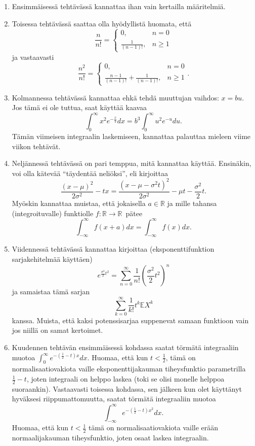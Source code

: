 \documentclass[11pt,a4paper]{amsart}
\newcommand{\R}{\mathbb{R}}
\newcommand{\E}{\mathbb{E}}
\newcommand{\1}{\mathbf{1}}
\begin{document}
\begin{Solution}
\begin{enumerate}
\item Ensimmäisessä tehtävässä kannattaa ihan vain kertailla määritelmiä. 
\item Toisessa tehtävässä saattaa olla hyödyllistä huomata, että 
\[
\frac{n}{n!}=\begin{cases}
0, & n=0\\
\frac{1}{(n-1)!}, & n\geq 1
\end{cases}
\]
ja vastaavasti 
\[
\frac{n^2}{n!}=\begin{cases}
0, & n=0\\
\frac{n-1}{(n-1)!}+\frac{1}{(n-1)!}, & n\geq 1
\end{cases}.
\]
\item Kolmannessa tehtävässä kannattaa ehkä tehdä muuttujan vaihdos: $x=bu$. Jos tämä ei ole tuttua, saat käyttää kaavaa 
\[
\int_{0}^\infty x^2 e^{-\frac{x}{b}}dx=b^3 \int_0^\infty u^2 e^{-u}du.
\]
Tämän viimeisen integraalin laskemiseen, kannattaa palauttaa mieleen viime viikon tehtävät.
\item Neljännessä tehtävässä on pari temppua, mitä kannattaa käyttää. Ensinäkin, voi olla kätevää ``täydentää neliöksi'', eli kirjoittaa 
\[
\frac{(x-\mu)^2}{2\sigma^2}-tx=\frac{(x-\mu-\sigma^2 t)^2}{2\sigma^2}-\mu t-\frac{\sigma^2}{2}t.
\]
Myöskin kannattaa muistaa, että jokaisella $a\in \R$ ja mille tahansa (integroituvalle) funktiolle $f:\R\to \R$ pätee 
\[
\int_{-\infty}^\infty f(x+a)dx=\int_{-\infty}^\infty f(x)dx.
\]
\item Viidennessä tehtävässä kannattaa kirjoittaa (eksponenttifunktion sarjakehitelmää käyttäen)
\[
e^{\frac{\sigma^2}{2}t^2}=\sum_{n=0}^\infty \frac{1}{n!} \left(\frac{\sigma^2}{2}t^2\right)^n 
\] 
ja samaistaa tämä sarjan
\[
\sum_{k=0}^\infty \frac{1}{k!}t^k \E X^k
\]
kanssa. Muista, että kaksi potenssisarjaa suppenevat samaan funktioon vain jos niillä on samat kertoimet.
\item Kuudennen tehtävän ensimmäisessä kohdassa saatat törmätä integraaliin muotoa $\int_0^\infty e^{-(\frac{1}{2}-t)x}dx$. Huomaa, että kun $t<\frac{1}{2}$‚ tämä on normalisaatiovakiota vaille eksponenttijakauman tiheysfunktio parametrilla $\frac{1}{2}-t$, joten integraali on helppo laskea (toki se olisi monelle helppoa suoraankin). Vastaavasti toisessa kohdassa, sen jälkeen kun olet käyttänyt hyväksesi riippumattomuutta, saatat törmätä integraaliin muotoa 
\[
\int_{-\infty}^\infty e^{-(\frac{1}{2}-t)x^2}dx.
\]
Huomaa, että kun $t<\frac{1}{2}$ tämä on normalisaatiovakiota vaille erään normaalijakauman tiheysfunktio, joten osaat laskea integraalin.
\end{enumerate}
\end{Solution}
\end{document}

